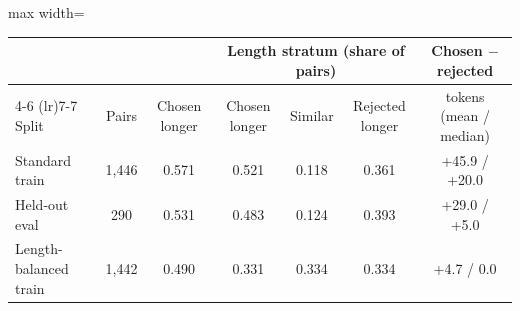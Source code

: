 \begin{adjustbox}{max width=\linewidth}
\begin{tabular}{lcccccc}
\toprule
 & & & \multicolumn{3}{c}{Length stratum (share of pairs)} & Chosen $-$ rejected \\
\cmidrule(lr){4-6} \cmidrule(lr){7-7}
Split & Pairs & Chosen longer & Chosen longer & Similar & Rejected longer & tokens (mean / median) \\
\midrule
Standard train & 1,446 & 0.571 & 0.521 & 0.118 & 0.361 & +45.9 / +20.0 \\
Held-out eval & 290 & 0.531 & 0.483 & 0.124 & 0.393 & +29.0 / +5.0 \\
Length-balanced train & 1,442 & 0.490 & 0.331 & 0.334 & 0.334 & +4.7 / 0.0 \\
\bottomrule
\end{tabular}
\end{adjustbox}

